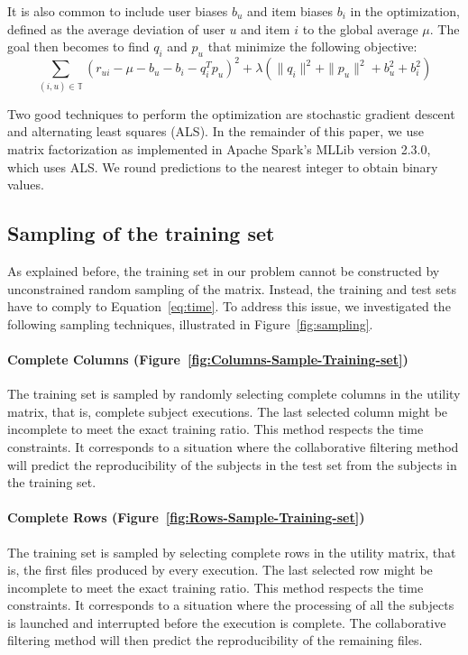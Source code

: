 \documentclass[10pt, conference, compsocconf]{IEEEtran}
\begin{document}
It is also common to include user biases $b_u$ and item biases $b_i$ in 
the optimization, defined as the average deviation of user $u$ and item 
$i$ to the global average $\mu$. The goal then becomes to find $q_i$ and $p_u$ that minimize the 
following objective:
\begin{equation*}
\sum_{(i,u) \in \mathbb{T}}\left( r_{ui} - \mu - b_u - b_i - q_i^Tp_u\right)^2+\lambda \left( \|{q_i}\|^2 + \|{p_u}\|^2 + b_u^2 + b_i^2\right)
\end{equation*}

Two good techniques to perform the optimization are stochastic gradient 
descent and alternating least squares (ALS). In the remainder of this 
paper, we use matrix factorization as implemented in Apache Spark's 
MLLib version 2.3.0, which uses ALS. We round predictions to the 
nearest integer to obtain binary values.


\subsection{Sampling of the training set}

\label{sec:training}

As explained before, the training set in our problem cannot be 
constructed by unconstrained random sampling of the matrix. Instead, 
the training and test sets have to comply to Equation~\ref{eq:time}. To 
address this issue, we investigated the following sampling techniques, illustrated in
Figure~\ref{fig:sampling}. 

\paragraph{Complete Columns 
(Figure~\ref{fig:Columns-Sample-Training-set})} The training set is 
sampled by randomly selecting complete columns in the utility matrix, 
that is, complete subject executions. The last selected column might be 
incomplete to meet the exact training ratio. This method respects the 
time constraints. It corresponds to a situation where the collaborative 
filtering method will predict the reproducibility of the subjects in 
the test set from the subjects in the training set. 

\paragraph{Complete Rows (Figure~\ref{fig:Rows-Sample-Training-set})} 
The training set is sampled by selecting complete rows in the utility 
matrix, that is, the first files produced by every execution. The last 
selected row might be incomplete to meet the exact training ratio. This 
method respects the time constraints. It corresponds to a situation 
where the processing of all the subjects is launched and interrupted 
before the execution is complete. The collaborative filtering method 
will then predict the reproducibility of the remaining files.
\end{document}
